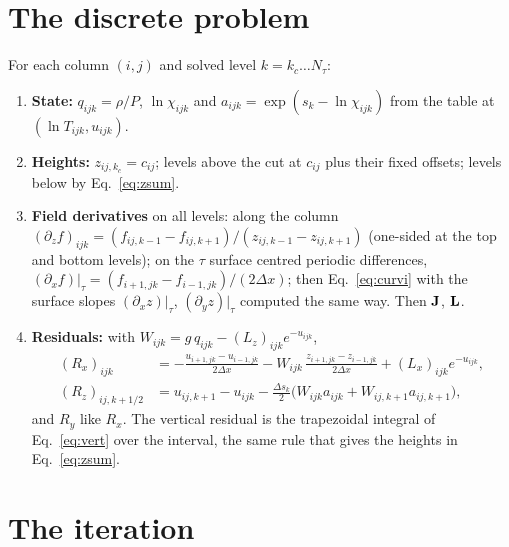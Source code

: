 \section{The discrete problem}\label{sec:disc}
For each column $(i,j)$ and solved level $k=k_c\dots N_\tau$:
\begin{enumerate}
\item \textbf{State:} $q_{ijk}=\rho/P$, $\ln\chi_{ijk}$ and $a_{ijk}=\exp(s_k-\ln\chi_{ijk})$ from the table at
$(\ln T_{ijk},u_{ijk})$.
\item \textbf{Heights:} $z_{ij,k_c}=c_{ij}$; levels above the cut at $c_{ij}$ plus their fixed offsets; levels below by
Eq.~\eqref{eq:zsum}.
\item \textbf{Field derivatives} on all levels: along the column
$(\partial_zf)_{ijk}=(f_{ij,k-1}-f_{ij,k+1})/(z_{ij,k-1}-z_{ij,k+1})$ (one-sided at the top and bottom levels); on the $\tau$
surface centred periodic differences, $(\partial_xf)|_\tau=(f_{i+1,jk}-f_{i-1,jk})/(2\Delta x)$; then Eq.~\eqref{eq:curvi}
with the surface slopes $(\partial_xz)|_\tau$, $(\partial_yz)|_\tau$ computed the same way. Then $\mathbf J$, $\mathbf L$.
\item \textbf{Residuals:} with $W_{ijk}=g\,q_{ijk}-(L_z)_{ijk}e^{-u_{ijk}}$,
\begin{align}
(R_x)_{ijk}&=-\frac{u_{i+1,jk}-u_{i-1,jk}}{2\Delta x}-W_{ijk}\,\frac{z_{i+1,jk}-z_{i-1,jk}}{2\Delta x}+(L_x)_{ijk}e^{-u_{ijk}},\\
(R_z)_{ij,k+1/2}&=u_{ij,k+1}-u_{ijk}-\frac{\Delta s_k}{2}\big(W_{ijk}a_{ijk}+W_{ij,k+1}a_{ij,k+1}\big),
\end{align}
and $R_y$ like $R_x$. The vertical residual is the trapezoidal integral of Eq.~\eqref{eq:vert} over the interval, the same
rule that gives the heights in Eq.~\eqref{eq:zsum}.
\end{enumerate}

\section{The iteration}\label{sec:iter}
